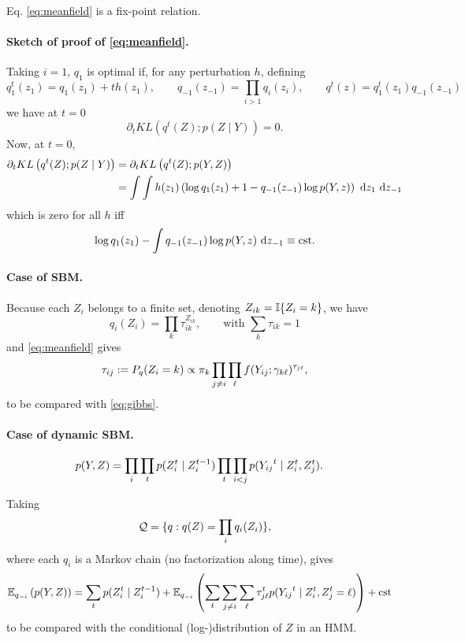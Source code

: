 \ra Eq. \eqref{eq:meanfield} is a fix-point relation.

\jump \paragraph{Sketch of proof of \eqref{eq:meanfield}.} Taking $i=1$, $q_1$ is optimal if, for any perturbation $h$, defining 
$$
q_1^t(z_1) = q_1(z_1) + t h(z_ 1), \qquad 
q_{-1}(z_{-1}) = \prod_{i > 1} q_i(z_i), \qquad 
q^t(z) = q_1^t(z_1) q_{-1}(z_{-1})
$$
we have at $t=0$
$$
\partial_t KL\left(q^t(Z); p(Z \mid Y)\right) = 0.
$$
Now, at $t=0$, 
\begin{align*}
 \partial_t KL\left(q^t(Z); p(Z \mid Y) \right)
 & =  \partial_t KL\left(q^t(Z); p(Y, Z) \right) \\
 & = \int \int h(z_1) \left(\log q_1(z_1) + 1 - q_ {-1}(z_{-1}) \log p(Y, z)  \right) \d z_1 \d z_{-1}
\end{align*}
which is zero for all $h$ iff
$$
\log q_1(z_1) - \int q_ {-1}(z_{-1}) \log p(Y, z) \d z_{-1} \equiv \cst.
$$

\jump \paragraph{Case of SBM.} 
Because each $Z_i$ belongs to a finite set, denoting $Z_{ik} = \mathbb I\{Z_i = k\}$, we have \citep{DPR08}
$$
q_i(Z_i) = \prod_k \tau_{ik}^{Z_{ik}}, 
\qquad \text{with } \sum_k \tau_{ik} = 1
$$
and \eqref{eq:meanfield} gives
$$
\tau_{ij}:= P_q(Z_i = k) \propto \pi_k \prod_{j \neq i} \prod_\ell f({Y_{ij}}; \gamma_{k\ell})^{\tau_{j\ell}},
$$
to be compared with \eqref{eq:gibbs}.

\jump \paragraph{Case of dynamic SBM.} \citep{MaM17}
\begin{align*}
 p(Y, Z) & = \prod_i \prod_t p(Z_i^t \mid Z_i^{t-1}) \prod_t \prod_{i < j} p({Y_{ij}}^t \mid Z_i^t, Z_j^t).
\end{align*}

Taking
$$
\mathcal{Q} = \{q: q(Z) = \prod_i q_i(Z_i)\},
$$
where each $q_i$ is a Markov chain (no factorization along time), gives
\begin{align*}
 \mathbb E_{q_{-i}} \left(p(Y, Z)\right) & = \sum_t p(Z_i^t \mid Z_i^{t-1}) + \mathbb E_{q_{-i}} \left(\sum_t \sum_{j \neq i} \sum_\ell \tau_{j\ell}^t p({Y_{ij}}^t \mid Z_i^t, Z_j^t=\ell)\right) + \text{cst}
\end{align*}
to be compared with the conditional (log-)distribution of $Z$ in an HMM.


